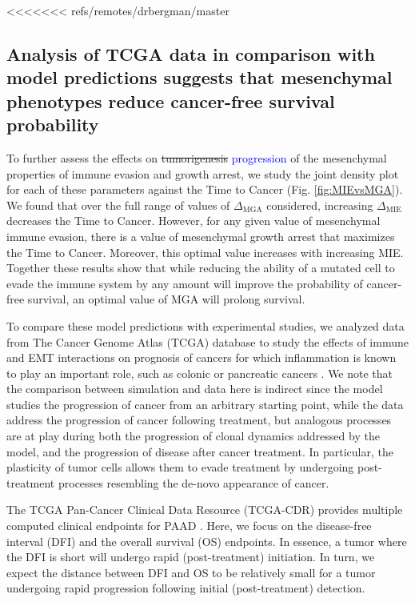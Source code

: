 \documentclass[11pt]{article}
\newcommand{\tcb} { \textcolor{blue} }
\begin{document}
<<<<<<< refs/remotes/drbergman/master
\subsection{Analysis of TCGA data in comparison with model predictions suggests that mesenchymal phenotypes reduce cancer-free survival probability}\label{tcga}


To further assess the effects on \sout{tumorigenesis} \tcb{progression} of the mesenchymal properties of immune evasion and growth arrest, we study the joint density plot for each of these parameters against the Time to Cancer (Fig. \ref{fig:MIEvsMGA}). We found that over the full range of values of $\Delta_\text{MGA}$ considered, increasing $\Delta_\text{MIE}$ decreases the Time to Cancer. However, for any given value of mesenchymal immune evasion, there is a value of mesenchymal growth arrest that maximizes the Time to Cancer. Moreover, this optimal value increases with increasing MIE. Together these results show that while reducing the ability of a mutated cell to evade the immune system by any amount will improve the probability of cancer-free survival, an optimal value of MGA will prolong survival. 
\par
To compare these model predictions with experimental studies, we analyzed data from The Cancer Genome Atlas (TCGA) database to study the effects of immune and EMT interactions on prognosis of cancers for which inflammation is known to play an important role, such as colonic or pancreatic cancers \cite{greten2019inflammation,hu2010inflammation}.
We note that the comparison between simulation and data here is indirect since the model studies the progression of cancer from an arbitrary starting point, while the data address the progression of cancer following treatment, but analogous processes are at play during both the progression of  clonal dynamics addressed by the model, and the progression of disease after cancer treatment.
In particular, the plasticity of tumor cells allows them to evade treatment by undergoing post-treatment processes resembling the de-novo appearance of cancer\cite{sanchez2018slow}.
\par 
The TCGA Pan-Cancer Clinical Data Resource (TCGA-CDR) provides multiple computed clinical endpoints for PAAD \cite{liu2018integrated}.
Here, we focus on the disease-free interval (DFI) and the overall survival (OS) endpoints.
In essence, a tumor where the DFI is short will undergo rapid (post-treatment) initiation.
In turn, we expect the distance between DFI and OS to be relatively small for a tumor undergoing rapid progression following initial (post-treatment) detection.
\end{document}
